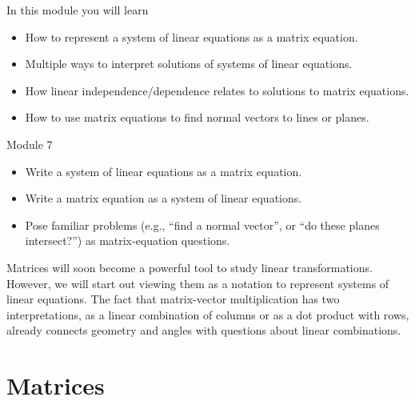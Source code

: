 \begin{module}
	\label{moduleMatRep}

	In this module you will learn
	\begin{itemize}
		\item How to represent a system of linear equations as a matrix equation.
		\item Multiple ways to interpret solutions of systems of linear equations.
		\item How linear independence/dependence relates to solutions to matrix equations.
		\item How to use matrix equations to find normal vectors to lines or planes.
	\end{itemize}

	
	
\end{module}
\begin{lesson}

	Module 7

	\begin{itemize}
		\item Write a system of linear equations as a matrix equation.
		\item Write a matrix equation as a system of linear equations.
		\item Pose familiar problems (e.g., ``find a normal vector'', or
			``do these planes intersect\mbox{?}'') as matrix-equation
			questions.
	\end{itemize}

	Matrices will soon become a powerful tool to study linear transformations.
	However, we will start out viewing them as a notation to represent
	systems of linear equations. The fact that matrix-vector multiplication
	has two interpretations, as a linear combination of columns or as a dot product
	with rows, already connects geometry and angles with questions about linear combinations.

\end{lesson}
	\bookonlynewpage
\section*{Matrices}

